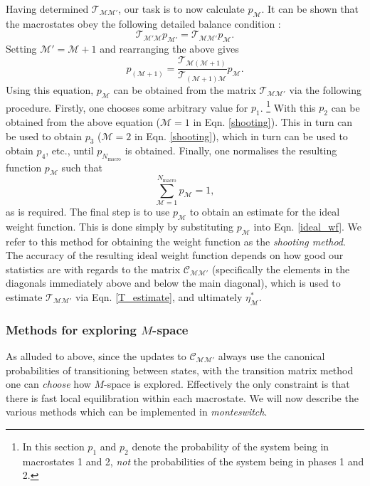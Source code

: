\documentclass{report}
\begin{document}
Having determined  $\mathcal{T}_{\mathcal{MM}'}$, our task is to now calculate $p_{\mathcal{M}}$. It can be shown that the macrostates obey the following
detailed balance condition \cite{Smith_1995}:
\begin{equation}
\mathcal{T}_{\mathcal{M}'\mathcal{M}}p_{\mathcal{M}'}=\mathcal{T}_{\mathcal{MM}'}p_{\mathcal{M}}.
\end{equation}
Setting $\mathcal{M}'=\mathcal{M}+1$ and rearranging the above gives
\begin{equation}\label{shooting}
p_{(\mathcal{M}+1)}=\frac{\mathcal{T}_{\mathcal{M}(\mathcal{M}+1)}}{\mathcal{T}_{(\mathcal{M}+1)\mathcal{M}}}p_{\mathcal{M}}.
\end{equation}
Using this equation, $p_{\mathcal{M}}$ can be obtained from the matrix $\mathcal{T}_{\mathcal{M}\mathcal{M}'}$ via the following procedure.
Firstly, one chooses some arbitrary value for $p_1$. 
\footnote{In this section $p_1$ and $p_2$ denote the probability of the system being in macrostates 1 and 2, \emph{not} the probabilities of
the system being in phases 1 and 2.}
With this $p_2$ can be obtained from the above equation ($\mathcal{M}=1$ in Eqn. \eqref{shooting}). 
This in turn can be used to obtain $p_3$ ($\mathcal{M}=2$ in Eqn. \eqref{shooting}), which in turn can be used to obtain $p_4$, etc., until
$p_{N_{\text{macro}}}$ is obtained. Finally, one normalises the resulting function $p_{\mathcal{M}}$ such that
\begin{equation}
\sum_{\mathcal{M}=1}^{N_{\text{macro}}}p_{\mathcal{M}}=1,
\end{equation}
as is required. The final step is to use $p_{\mathcal{M}}$ to obtain an estimate for the ideal weight function. This is done simply by substituting 
$p_{\mathcal{M}}$ into Eqn. \eqref{ideal_wf}. We refer to this method for obtaining the weight function as the \emph{shooting method}.
The accuracy of the resulting ideal weight function depends on how good our statistics are with regards to
the matrix $\mathcal{C}_{\mathcal{M}\mathcal{M}'}$ (specifically the elements in the diagonals immediately above and below the main diagonal), which is used to
estimate $\mathcal{T}_{\mathcal{M}\mathcal{M}'}$ via Eqn. \eqref{T_estimate}, and ultimately $\eta^*_{\mathcal{M}}$. 


\subsubsection{Methods for exploring $M$-space}
As alluded to above, since the updates to $\mathcal{C}_{\mathcal{M}\mathcal{M}'}$ always use the canonical probabilities of transitioning between states, 
with the transition matrix method one can \emph{choose} how $M$-space is explored. Effectively the only constraint is that there is fast local 
equilibration within each macrostate. We will now describe the various methods which can be implemented in \emph{monteswitch}.
\end{document}
